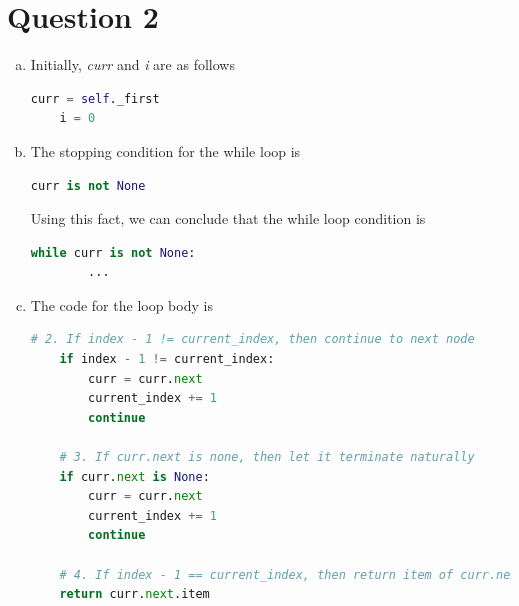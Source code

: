 \documentclass[12pt]{article}
\begin{document}
\section*{Question 2}
\begin{enumerate}[a.]
    \item

    Initially, \textit{curr} and \textit{i} are as follows

    \begin{lstlisting}[language=Python]
    curr = self._first
    i = 0
    \end{lstlisting}

    \item

    The stopping condition for the while loop is

    \begin{lstlisting}[language=Python]
    curr is not None
    \end{lstlisting}

    \bigskip

    Using this fact, we can conclude that the while loop condition is

    \begin{lstlisting}[language=Python]
    while curr is not None:
        ...
    \end{lstlisting}

    \item
    The code for the loop body is
    \begin{lstlisting}[language=Python]
    # 2. If index - 1 != current_index, then continue to next node
    if index - 1 != current_index:
        curr = curr.next
        current_index += 1
        continue

    # 3. If curr.next is none, then let it terminate naturally
    if curr.next is None:
        curr = curr.next
        current_index += 1
        continue

    # 4. If index - 1 == current_index, then return item of curr.next
    return curr.next.item
    \end{lstlisting}

\end{enumerate}
\end{document}
